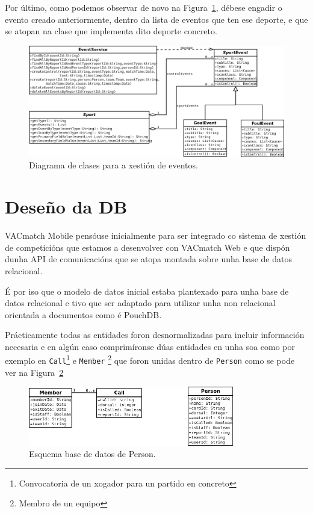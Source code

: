   Por último, como podemos observar de novo na 
Figura~\ref{fig:design:eventsdiagram}, débese engadir o evento creado 
anteriormente, dentro da lista de eventos que ten ese deporte, e que se atopan 
na clase que implementa dito deporte concreto.

    \begin{figure}[h!]
      \begin{center}
  \includegraphics[width=\textwidth]{./img/diagrams/events_diagram.png}
      \caption{Diagrama de clases para a xestión de eventos.}
      \label{fig:design:eventsdiagram}
      \end{center}
    \end{figure}


  \section{Deseño da DB}
  VACmatch Mobile pensóuse inicialmente para ser integrado co sistema de 
xestión de competicións que estamos a desenvolver con VACmatch Web e que dispón 
dunha API de comunicacións que se atopa montada sobre unha base de datos 
relacional.

  É por iso que o modelo de datos inicial estaba plantexado para unha base de 
datos relacional e tivo que ser adaptado para utilizar unha non relacional 
orientada a documentos como é PouchDB.

  Prácticamente todas as entidades foron desnormalizadas para incluir 
información necesaria e en algún caso comprimíronse dúas entidades en unha soa 
como por exemplo en \lstinline{Call}\footnote{Convocatoria de un xogador para 
un partido en concreto} e \lstinline{Member} \footnote{Membro de un equipo} que 
foron unidas 
dentro de \lstinline{Person} como se pode ver na 
Figura~\ref{fig:design:persondbdiagram}

    \begin{figure}[h!]
      \begin{center}
      \includegraphics[width=0.8\textwidth]{./img/diagrams/person_diagram.png}
      \caption{Esquema base de datos de Person.}
      \label{fig:design:persondbdiagram}
      \end{center}
    \end{figure}

